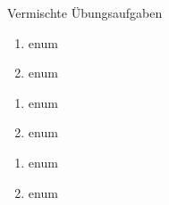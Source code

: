 


\begin{inhalt}
	\item Vermischte Übungsaufgaben
\end{inhalt}

\begin{enumerate}
	\item enum
	\item	enum
\end{enumerate}

\begin{enumerate}
	\item enum
	\item	enum
\end{enumerate}


\begin{enumerate}
	\item enum
	\item	enum
\end{enumerate}


